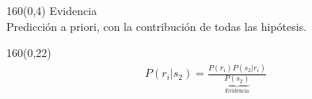 \documentclass[shownotes,aspectratio=169]{beamer}
\begin{document}
\begin{frame}[plain]
\begin{textblock}{160}(0,4)
 \centering \LARGE Evidencia \\
 \Large Predicción a priori, con la contribución de todas las hipótesis.
 \end{textblock}
 \vspace{1cm}

  \begin{textblock}{160}(0,22)
  \begin{align*}
   P(r_i|s_2) = \frac{P(r_i) P(s_2|r_i)}{\underbrace{P(s_2)}_{\text{Evidencia}}}
  \end{align*}
 \end{textblock}



\end{frame}
\end{document}
